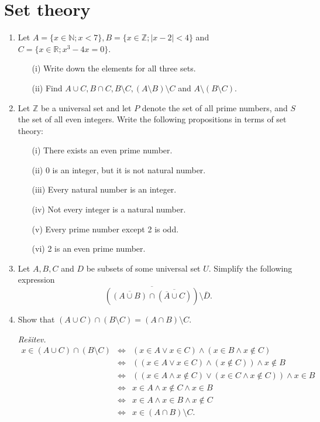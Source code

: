 \documentclass[11pt,paper=b5,footinclude,headinclude]{scrbook} %
\theoremstyle{remark}
\theoremstyle{definition} %
\theoremstyle{theorem} %
\begin{document}
\chapter{Set theory}
\begin{enumerate}

\item Let $A = \{ x \in \mathbb{N}; x < 7\}, B = \{x \in  \mathbb{Z}; |x - 2| < 4\}$ and $C = \{x \in\mathbb{R}; x^3 -  4x = 0\}$.
\begin{enumerate}
\item[(i)]  Write down the elements for all three sets.
\item[(ii)] Find $A \cup C, B \cap C, B \setminus C, (A \setminus B) \setminus C$ and $A \setminus (B \setminus C)$.
\end{enumerate}

\item Let  $\mathbb{Z}$ be a universal set and let  $P$ denote the set of all prime numbers, and $S$ the set of all even integers. Write the following propositions in terms of set theory:
\begin{itemize}
\item[(i)] There exists an even prime number. 
\item[(ii)] $0$ is an integer, but it is not natural number. 
\item[(iii)] Every natural number is an integer. 
\item[(iv)] Not every integer is a natural number. 
\item[(v)] Every prime number except 2 is odd. 
\item[(vi)] 2 is an even prime number. \quad [$2\in S\cap P$]
\end{itemize}

\item Let  $A, B, C$ and $D$  be subsets of some universal set  $U$. Simplify the following expression
$$\overline{(\overline{(A\cup B)} \cap \overline{(\overline{A} \cup C)})}\setminus \overline{D}.$$

\item Show that $(A\cup C)\cap (B\setminus C) = (A\cap B)\setminus C$.

\emph{ Rešitev.} 
\begin{eqnarray*}
x\in (A\cup C)\cap (B\setminus C) &\Leftrightarrow & (x\in A \vee x\in C) \wedge (x\in B \wedge x\notin C)\\
 &\Leftrightarrow & ((x\in A \vee x\in C) \wedge (x\notin C))\wedge x\notin B\\
&\Leftrightarrow & ((x\in A \wedge x\notin C) \vee (x\in C \wedge x\notin C)) \wedge
 x\in B\\
&\Leftrightarrow & x\in A \wedge x\notin C  \wedge x\in B\\
&\Leftrightarrow & x\in A \wedge x\in B  \wedge x\notin C \\
&\Leftrightarrow & x \in (A\cap B)\setminus C. 
\end{eqnarray*}


\end{enumerate}
\end{document}
